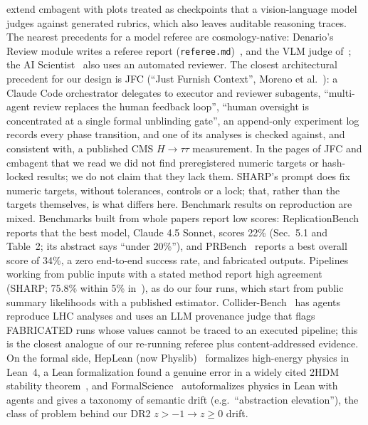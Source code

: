 \documentclass[11pt]{article}
\begin{document}
extend cmbagent with plots treated as checkpoints that a vision-language model judges against generated rubrics, which also leaves auditable reasoning traces.
The nearest precedents for a model referee are cosmology-native: Denario's Review module writes a referee report (\texttt{referee.md})~\cite[Sec.~3.7]{denario2025},
and the VLM judge of~\cite{gandhi2025}; the AI Scientist~\cite{aiscientist} also uses an automated reviewer.
The closest architectural precedent for our design is JFC (``Just Furnish Context'', Moreno et al.~\cite{moreno2026}): a Claude Code orchestrator delegates to executor
and reviewer subagents, ``multi-agent review replaces the human feedback loop'', ``human oversight is concentrated at a single formal unblinding gate'', an append-only
experiment log records every phase transition, and one of its analyses is checked against, and consistent with, a published CMS $H\to\tau\tau$ measurement. In the pages of JFC and cmbagent that we
read we did not find preregistered numeric targets or hash-locked results; we do not claim that they lack them. SHARP's prompt does fix numeric targets, without
tolerances, controls or a lock; that, rather than the targets themselves, is what differs here.
Benchmark results on reproduction are mixed. Benchmarks built from whole papers report low scores: ReplicationBench~\cite{replicationbench} reports that the best model, Claude 4.5 Sonnet,
scores 22\% (Sec.~5.1 and Table~2; its abstract says ``under 20\%''), and PRBench~\cite{prbench} reports a best overall score of 34\%, a zero end-to-end
success rate, and fabricated outputs. Pipelines working from public inputs with a stated method report high agreement (SHARP; 75.8\% within 5\% in~\cite{huang2026scrutiny}),
as do our four runs, which start from public summary likelihoods with a published estimator. Collider-Bench~\cite{colliderbench} has agents reproduce LHC analyses and uses an LLM provenance judge that flags
FABRICATED runs whose values cannot be traced to an executed pipeline; this is the closest analogue of our re-running referee plus content-addressed evidence.
On the formal side, HepLean (now Physlib)~\cite{heplean,toobysmith2026} formalizes high-energy physics in Lean~4, a Lean formalization found a genuine
error in a widely cited 2HDM stability theorem~\cite{toobysmith2026}, and FormalScience~\cite{formalscience} autoformalizes physics in Lean with agents and
gives a taxonomy of semantic drift (e.g.\ ``abstraction elevation''), the class of problem behind our DR2 $z>-1\to z\ge0$ drift.
\end{document}
